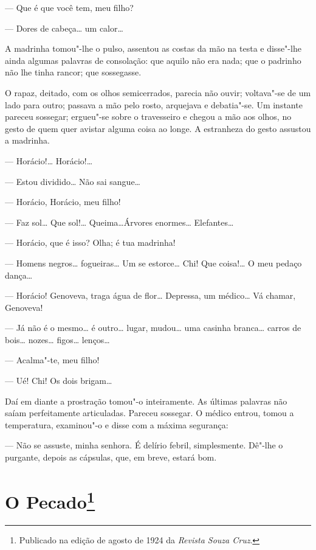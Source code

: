 --- Que é que você tem, meu filho?

--- Dores de cabeça\ldots{} um calor\ldots{}

A madrinha tomou"-lhe o pulso, assentou as costas da mão na testa e
disse"-lhe ainda algumas palavras de consolação: que aquilo não era nada;
que o padrinho não lhe tinha rancor; que sossegasse.

O rapaz, deitado, com os olhos semicerrados, parecia não ouvir;
voltava"-se de um lado para outro; passava a mão pelo rosto, arquejava e
debatia"-se. Um instante pareceu sossegar; ergueu"-se sobre o travesseiro
e chegou a mão aos olhos, no gesto de quem quer avistar alguma coisa ao
longe. A estranheza do gesto assustou a madrinha.

--- Horácio!\ldots{} Horácio!\ldots{}

--- Estou dividido\ldots{} Não sai sangue\ldots{}

--- Horácio, Horácio, meu filho!

--- Faz sol\ldots{} Que sol!\ldots{} Queima\ldots{}Árvores
enormes\ldots{} Elefantes\ldots{}

--- Horácio, que é isso? Olha; é tua madrinha!

--- Homens negros\ldots{} fogueiras\ldots{} Um se estorce\ldots{} Chi!
Que coisa!\ldots{} O meu pedaço dança\ldots{}

--- Horácio! Genoveva, traga água de flor\ldots{} Depressa, um
médico\ldots{} Vá chamar, Genoveva!

--- Já não é o mesmo\ldots{} é outro\ldots{} lugar, mudou\ldots{} uma
casinha branca\ldots{} carros de bois\ldots{} nozes\ldots{}
figos\ldots{} lenços\ldots{}

--- Acalma"-te, meu filho!

--- Ué! Chi! Os dois brigam\ldots{}

Daí em diante a prostração tomou"-o inteiramente. As últimas palavras não
saíam perfeitamente articuladas. Pareceu sossegar. O médico entrou,
tomou a temperatura, examinou"-o e disse com a máxima segurança:

--- Não se assuste, minha senhora. É delírio febril, simplesmente. Dê"-lhe
o purgante, depois as cápsulas, que, em breve, estará bom.



\chapter[O Pecado]{O Pecado\footnote[*]{Publicado na edição de agosto de 1924 da \emph{Revista Souza Cruz}.}}

